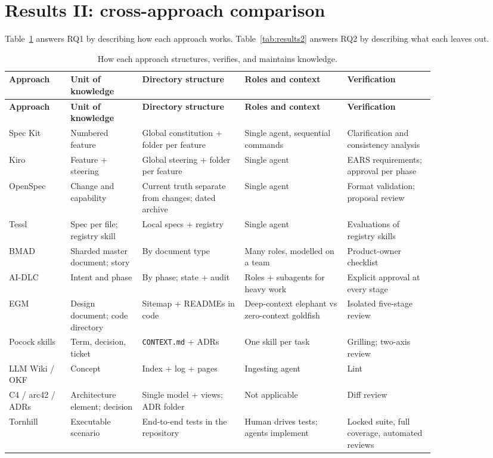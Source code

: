 \documentclass[11pt]{article}
\begin{document}
\section{Results II: cross-approach comparison}

Table~\ref{tab:results1} answers RQ1 by describing how each approach works. Table~\ref{tab:results2} answers RQ2 by describing what each leaves out.

\small
\begin{longtable}{p{0.12\linewidth}p{0.14\linewidth}p{0.2\linewidth}p{0.2\linewidth}p{0.17\linewidth}}
\caption{How each approach structures, verifies, and maintains knowledge.}
\label{tab:results1}\\
\toprule
\textbf{Approach} & \textbf{Unit of knowledge} & \textbf{Directory structure} & \textbf{Roles and context} & \textbf{Verification} \\
\midrule
\endfirsthead
\toprule
\textbf{Approach} & \textbf{Unit of knowledge} & \textbf{Directory structure} & \textbf{Roles and context} & \textbf{Verification} \\
\midrule
\endhead
Spec Kit & Numbered feature & Global constitution + folder per feature & Single agent, sequential commands & Clarification and consistency analysis \\
Kiro & Feature + steering & Global steering + folder per feature & Single agent & EARS requirements; approval per phase \\
OpenSpec & Change and capability & Current truth separate from changes; dated archive & Single agent & Format validation; proposal review \\
Tessl & Spec per file; registry skill & Local specs + registry & Single agent & Evaluations of registry skills \\
BMAD & Sharded master document; story & By document type & Many roles, modelled on a team & Product-owner checklist \\
AI-DLC & Intent and phase & By phase; state + audit & Roles + subagents for heavy work & Explicit approval at every stage \\
EGM & Design document; code directory & Sitemap + READMEs in code & Deep-context elephant vs zero-context goldfish & Isolated five-stage review \\
Pocock skills & Term, decision, ticket & \texttt{CONTEXT.md} + ADRs & One skill per task & Grilling; two-axis review \\
LLM Wiki / OKF & Concept & Index + log + pages & Ingesting agent & Lint \\
C4 / arc42 / ADRs & Architecture element; decision & Single model + views; ADR folder & Not applicable & Diff review \\
Tornhill & Executable scenario & End-to-end tests in the repository & Human drives tests; agents implement & Locked suite, full coverage, automated reviews \\
\bottomrule
\end{longtable}
\normalsize
\end{document}
